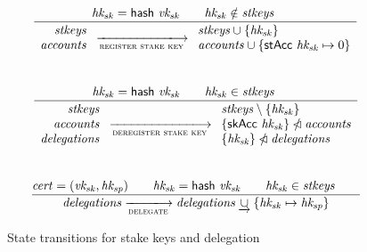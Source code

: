 \documentclass[11pt,a4paper]{article}
\newcommand{\restrictdom}{\lhd}
\newcommand{\subtractdom}{\mathbin{\slashed{\restrictdom}}}
\newcommand{\union}{\cup}
\newcommand{\unionoverride}{\mathbin{\underrightarrow\cup}}
\newcommand{\var}[1]{\mathit{#1}}
\newcommand{\fun}[1]{\mathsf{#1}}
\newcommand{\transitionarrow}[2]{\xlongrightarrow[\textsc{#1}]{#2}}
\begin{document}
\begin{figure}
\begin{equation*}
\frac{
  \var{hk_{sk}} = \fun{hash} ~ \var{vk_{sk}} \qquad
  \var{hk_{sk}} \notin \var{stkeys} \qquad
}{
  \begin{array}{r}
    \var{stkeys} \\
    \var{accounts}
  \end{array}
  \transitionarrow{register stake key}{}
  \begin{array}{l}
    \var{stkeys} \union \{\var{hk_{sk}}\} \\
    \var{accounts} \union \{\fun{stAcc}~\var{hk_{sk}} \mapsto 0\}
  \end{array}
}
\end{equation*}
%
\\[1em]
%
\begin{equation*}
\frac{
  \var{hk_{sk}} = \fun{hash} ~ \var{vk_{sk}} \qquad
  \var{hk_{sk}} \in \var{stkeys} \qquad
}{
  \begin{array}{r}
    \var{stkeys} \\ \var{accounts} \\ \var{delegations}
  \end{array}
  \transitionarrow{deregister stake key}{}
  \begin{array}{l}
  \var{stkeys} \setminus \{\var{hk_{sk}}\} \\
  \{\fun{skAcc}~\var{hk_{sk}}\} \subtractdom \var{accounts} \\
  \{\var{hk_{sk}}\} \subtractdom \var{delegations}
  \end{array}
}
\end{equation*}
%
\\[1em]
%
\begin{equation*}
\frac{
  \var{cert} = (\var{vk_{sk}}, \var{hk_{sp}}) \qquad
  \var{hk_{sk}} = \fun{hash} ~ \var{vk_{sk}} \qquad
  \var{hk_{sk}} \in \var{stkeys} \qquad
}{
  \var{delegations}
  \transitionarrow{delegate}{}
  \var{delegations} \unionoverride \{\var{hk_{sk}} \mapsto \var{hk_{sp}}\}
}
\end{equation*}

\caption{State transitions for stake keys and delegation}
\label{fig:delegation_transitions}
\end{figure}
\end{document}

